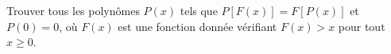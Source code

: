 Trouver tous les polynômes $P(x)$ tels que $P[F(x)] = F[P(x)]$ et $P(0) = 0$, où $F(x)$ est une fonction donnée vérifiant $F(x) > x$ pour tout $x \geq 0$.
